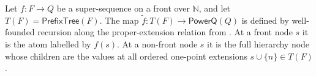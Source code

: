 \begin{definition}
Let $f:F\to Q$ be a super-sequence on a front over $\mathbb N$, and let
$T(F)=\mathsf{PrefixTree}(F)$.  The map
$\widetilde f:T(F)\to\mathsf{PowerQ}(Q)$ is defined by well-founded recursion
along the proper-extension relation from
.  At a front node $s$ it is the atom labelled
by $f(s)$.  At a non-front node $s$ it is the full hierarchy node whose
children are the values at all ordered one-point extensions
$s\cup\{n\}\in T(F)$.
\end{definition}
